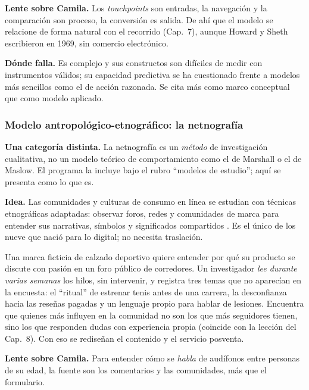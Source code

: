 \textbf{Lente sobre Camila.} Los \emph{touchpoints} son entradas, la
navegación y la comparación son proceso, la conversión es salida. De ahí que
el modelo se relacione de forma natural con el recorrido (Cap.~7), aunque Howard
y Sheth escribieron en 1969, sin comercio electrónico.

\textbf{Dónde falla.} Es complejo y sus constructos son difíciles de medir con
instrumentos válidos; su capacidad predictiva se ha cuestionado frente a modelos
más sencillos como el de acción razonada. Se cita más como marco conceptual que
como modelo aplicado.

\subsubsection{Modelo antropológico-etnográfico: la netnografía}
\label{sec:cap09-netno}

\begin{cajaAtencion}
\textbf{Una categoría distinta.} La netnografía es un \emph{método} de
investigación cualitativa, no un modelo teórico de comportamiento como el de
Marshall o el de Maslow. El programa la incluye bajo el rubro \enquote{modelos
de estudio}; aquí se presenta como lo que es.
\end{cajaAtencion}

\textbf{Idea.} Las comunidades y culturas de consumo en línea se estudian con técnicas
etnográficas adaptadas: observar foros, redes y comunidades de marca para
entender sus narrativas, símbolos y significados compartidos
\parencite{kozinets2002,kozinets2015}. Es el único de los nueve que nació
para lo digital; no necesita traslación.

\begin{cajaEjemplo}[title={Ejemplo: una comunidad de corredores}]
Una marca ficticia de calzado deportivo quiere entender por qué su producto se
discute con pasión en un foro público de corredores. Un investigador
\emph{lee durante varias semanas} los hilos, sin intervenir, y registra tres
temas que no aparecían en la encuesta: el \enquote{ritual} de estrenar
tenis antes de una carrera, la desconfianza hacia las reseñas pagadas y un
lenguaje propio para hablar de lesiones. Encuentra que quienes más influyen en
la comunidad no son los que más seguidores tienen, sino los que responden dudas
con experiencia propia (coincide con la lección del Cap.~8). Con eso se
rediseñan el contenido y el servicio posventa.
\end{cajaEjemplo}

\textbf{Lente sobre Camila.} Para entender cómo se \emph{habla} de audífonos
entre personas de su edad, la fuente son los comentarios y las comunidades,
más que el formulario.

